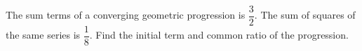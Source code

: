 
%
%
%
%
% 
% 

\question[4] The sum terms of a converging geometric progression is $\dfrac{3}{2}$. The sum of squares of the same series is $\dfrac{1}{8}$. Find the initial term and common ratio of the progression.


\ifprintanswers
\fi 

